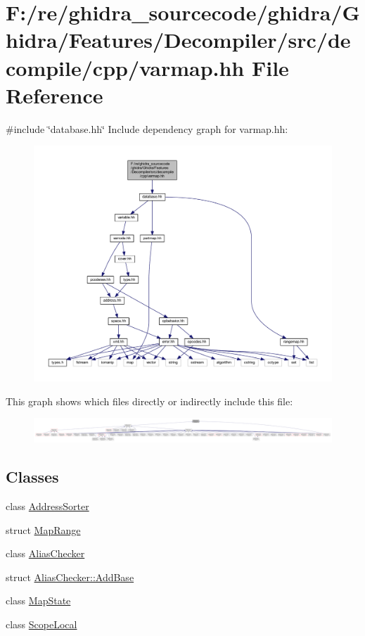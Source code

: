 \hypertarget{varmap_8hh}{}\section{F\+:/re/ghidra\+\_\+sourcecode/ghidra/\+Ghidra/\+Features/\+Decompiler/src/decompile/cpp/varmap.hh File Reference}
\label{varmap_8hh}
{\ttfamily \#include \char`\"{}database.\+hh\char`\"{}}\newline
Include dependency graph for varmap.\+hh\+:
\nopagebreak
\begin{figure}[H]
\begin{center}
\leavevmode
\includegraphics[width=350pt]{varmap_8hh__incl}
\end{center}
\end{figure}
This graph shows which files directly or indirectly include this file\+:
\nopagebreak
\begin{figure}[H]
\begin{center}
\leavevmode
\includegraphics[width=350pt]{varmap_8hh__dep__incl}
\end{center}
\end{figure}
\subsection*{Classes}
\begin{DoxyCompactItemize}
\item 
class \mbox{\hyperlink{class_address_sorter}{Address\+Sorter}}
\item 
struct \mbox{\hyperlink{struct_map_range}{Map\+Range}}
\item 
class \mbox{\hyperlink{class_alias_checker}{Alias\+Checker}}
\item 
struct \mbox{\hyperlink{struct_alias_checker_1_1_add_base}{Alias\+Checker\+::\+Add\+Base}}
\item 
class \mbox{\hyperlink{class_map_state}{Map\+State}}
\item 
class \mbox{\hyperlink{class_scope_local}{Scope\+Local}}
\end{DoxyCompactItemize}
